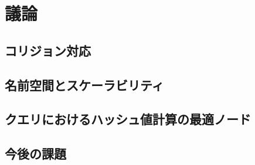 \section{議論}
\subsection{コリジョン対応}
\subsection{名前空間とスケーラビリティ}
\subsection{クエリにおけるハッシュ値計算の最適ノード}
\subsection{今後の課題}
